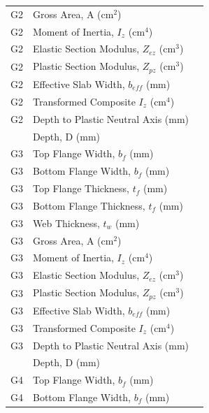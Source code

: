\documentclass[12pt,a4paper]{report}
\numberwithin{table}{chapter}
\numberwithin{figure}{chapter}
\begin{document}
\begin{longtable}{|C{2.5cm}|L{8.0cm}|>{\centering\arraybackslash}p{5.0cm}|}
G2 & \textnormal{Gross Area, A (cm$^2$)} &  \\[6pt]
G2 & \textnormal{Moment of Inertia, $I_z$ (cm$^4$)} &  \\[6pt]
G2 & \textnormal{Elastic Section Modulus, $Z_{ez}$ (cm$^3$)} &  \\[6pt]
G2 & \textnormal{Plastic Section Modulus, $Z_{pz}$ (cm$^3$)} &  \\[6pt]
G2 & \textnormal{Effective Slab Width, $b_{eff}$ (mm)} &  \\[6pt]
G2 & \textnormal{Transformed Composite $I_z$ (cm$^4$)} &  \\[6pt]
G2 & \textnormal{Depth to Plastic Neutral Axis (mm)} &  \\[6pt]
\hline
{} & \textnormal{Depth, D (mm)} &  \\[6pt]
G3 & \textnormal{Top Flange Width, $b_f$ (mm)} &  \\[6pt]
G3 & \textnormal{Bottom Flange Width, $b_f$ (mm)} &  \\[6pt]
G3 & \textnormal{Top Flange Thickness, $t_f$ (mm)} &  \\[6pt]
G3 & \textnormal{Bottom Flange Thickness, $t_f$ (mm)} &  \\[6pt]
G3 & \textnormal{Web Thickness, $t_w$ (mm)} &  \\[6pt]
G3 & \textnormal{Gross Area, A (cm$^2$)} &  \\[6pt]
G3 & \textnormal{Moment of Inertia, $I_z$ (cm$^4$)} &  \\[6pt]
G3 & \textnormal{Elastic Section Modulus, $Z_{ez}$ (cm$^3$)} &  \\[6pt]
G3 & \textnormal{Plastic Section Modulus, $Z_{pz}$ (cm$^3$)} &  \\[6pt]
G3 & \textnormal{Effective Slab Width, $b_{eff}$ (mm)} &  \\[6pt]
G3 & \textnormal{Transformed Composite $I_z$ (cm$^4$)} &  \\[6pt]
G3 & \textnormal{Depth to Plastic Neutral Axis (mm)} &  \\[6pt]
\hline
{} & \textnormal{Depth, D (mm)} &  \\[6pt]
G4 & \textnormal{Top Flange Width, $b_f$ (mm)} &  \\[6pt]
G4 & \textnormal{Bottom Flange Width, $b_f$ (mm)} &  \\[6pt]

\end{longtable}
\end{document}
